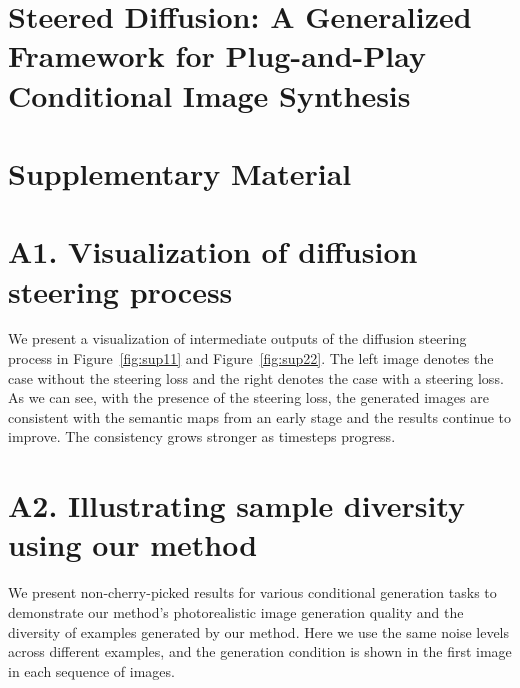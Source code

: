 \documentclass[10pt,twocolumn,letterpaper]{article}
\begin{document}
\begin{strip} %
\section*{\centering Steered Diffusion: A Generalized Framework for Plug-and-Play\\ Conditional Image Synthesis } %
\section*{\centering Supplementary Material} %

\end{strip}
\begin{appendices}

\section*{A1. Visualization of diffusion steering process}
We present a visualization of intermediate outputs of the diffusion steering process in Figure~\ref{fig:sup11} and Figure~\ref{fig:sup22}. The left image denotes the case without the steering loss and the right denotes the case with a steering loss. As we can see, with the presence of the steering loss, the generated images are consistent with the semantic maps from an early stage and the results continue to improve. The consistency grows stronger as timesteps progress.


\section*{A2. Illustrating sample diversity using our method}
We present non-cherry-picked results for various conditional generation tasks to demonstrate our method's photorealistic image generation quality and the diversity of examples generated by our method. Here we use the same noise levels across different examples, and the generation condition is shown in the first image in each sequence of images.















\end{appendices}
\end{document}
